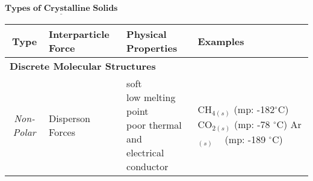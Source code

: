 \documentclass{article}
\begin{document}
\newcommand{\Tstrutsolids}{\rule{0pt}{7ex}}         %
\newcommand{\Bstrutsolids}{\rule[-7ex]{0pt}{0pt}}   %
\newcommand{\TBstrutsolids}{\Tstrutsolids\Bstrutsolids}
\newcommand{\Tstrutsolidstwo}{\rule{0pt}{3ex}}         %
\newcommand{\Bstrutsolidstwo}{\rule[-1.5ex]{0pt}{0pt}}   %
\newcommand{\TBstrutsolidstwo}{\Tstrutsolidstwo\Bstrutsolidstwo}
\newcommand{\Tstrutsolidsthree}{\rule{0pt}{2.5ex}}         %
\newcommand{\Bstrutsolidsthree}{\rule[-1ex]{0pt}{0pt}}   %
\newcommand{\TBstrutsolidsthree}{\Tstrutsolidsthree\Bstrutsolidsthree}
\begin{qq}

	\begin{center}

		$\underline{\textbf{Types of Crystalline Solids}}$
		\vspace{3pt}

		\begin{tabular}{clll}
			\hline
			Type                      & Interparticle Force & Physical Properties          & Examples \TBstrutsolidsthree \\
			\hline
			\multicolumn{4}{l}{\textbf{Discrete Molecular Structures}} \TBstrutsolidstwo                                  \\
			\hline
			\textit{Non-Polar}        & Disperson Forces    & \makecell[l]{soft                                           \\ low melting point \\ poor thermal and \\ electrical conductor} & \makecell[l]{CH$_{4(s)}$ \textcolor{pag!60}{(mp: -182$^{\circ}$C)} \\ CO$_{2(s)}$ \textcolor{pag!60}{(mp: -78 $^{\circ}$C)} \\ Ar$_{(s)}$ $\:\:\:\:$\textcolor{pag!60}{(mp: -189 $^{\circ}$C)}} \TBstrutsolids \\


\end{tabular}
\end{center}
\end{qq}
\end{document}
